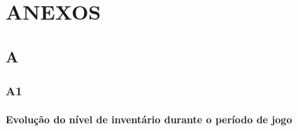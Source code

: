 \appendix

\part*{ANEXOS}

\chapter{A}

\section{A1}
\subsection{Evolução do nível de inventário durante o período de jogo}








